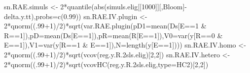 \documentclass[
]{book}
\newenvironment{Shaded}{\begin{snugshade}}{\end{snugshade}}
\newcommand{\AttributeTok}[1]{\textcolor[rgb]{0.77,0.63,0.00}{#1}}
\newcommand{\DecValTok}[1]{\textcolor[rgb]{0.00,0.00,0.81}{#1}}
\newcommand{\FloatTok}[1]{\textcolor[rgb]{0.00,0.00,0.81}{#1}}
\newcommand{\FunctionTok}[1]{\textcolor[rgb]{0.00,0.00,0.00}{#1}}
\newcommand{\NormalTok}[1]{#1}
\newcommand{\OtherTok}[1]{\textcolor[rgb]{0.56,0.35,0.01}{#1}}
\newcommand{\SpecialCharTok}[1]{\textcolor[rgb]{0.00,0.00,0.00}{#1}}
\newcommand{\StringTok}[1]{\textcolor[rgb]{0.31,0.60,0.02}{#1}}
\theoremstyle{definition}
\theoremstyle{definition}
\theoremstyle{definition}
\theoremstyle{definition}
\theoremstyle{remark}
\begin{document}
\begin{Shaded}
\begin{Highlighting}[]
\NormalTok{sn.RAE.simuls }\OtherTok{\textless{}{-}} \DecValTok{2}\SpecialCharTok{*}\FunctionTok{quantile}\NormalTok{(}\FunctionTok{abs}\NormalTok{(simuls.elig[[}\StringTok{\textquotesingle{}1000\textquotesingle{}}\NormalTok{]][,}\StringTok{\textquotesingle{}Bloom\textquotesingle{}}\NormalTok{]}\SpecialCharTok{{-}}\NormalTok{delta.y.tt),}\AttributeTok{probs=}\FunctionTok{c}\NormalTok{(}\FloatTok{0.99}\NormalTok{))}
\NormalTok{sn.RAE.IV.plugin }\OtherTok{\textless{}{-}} \DecValTok{2}\SpecialCharTok{*}\FunctionTok{qnorm}\NormalTok{((.}\DecValTok{99}\SpecialCharTok{+}\DecValTok{1}\NormalTok{)}\SpecialCharTok{/}\DecValTok{2}\NormalTok{)}\SpecialCharTok{*}\FunctionTok{sqrt}\NormalTok{(}\FunctionTok{var.RAE.plugin}\NormalTok{(}\AttributeTok{pD1=}\FunctionTok{mean}\NormalTok{(Ds[E}\SpecialCharTok{==}\DecValTok{1} \SpecialCharTok{\&}\NormalTok{ R}\SpecialCharTok{==}\DecValTok{1}\NormalTok{]),}\AttributeTok{pD=}\FunctionTok{mean}\NormalTok{(Ds[E}\SpecialCharTok{==}\DecValTok{1}\NormalTok{]),}\AttributeTok{pR=}\FunctionTok{mean}\NormalTok{(R[E}\SpecialCharTok{==}\DecValTok{1}\NormalTok{]),}\AttributeTok{V0=}\FunctionTok{var}\NormalTok{(y[R}\SpecialCharTok{==}\DecValTok{0} \SpecialCharTok{\&}\NormalTok{ E}\SpecialCharTok{==}\DecValTok{1}\NormalTok{]),}\AttributeTok{V1=}\FunctionTok{var}\NormalTok{(y[R}\SpecialCharTok{==}\DecValTok{1} \SpecialCharTok{\&}\NormalTok{ E}\SpecialCharTok{==}\DecValTok{1}\NormalTok{]),}\AttributeTok{N=}\FunctionTok{length}\NormalTok{(y[E}\SpecialCharTok{==}\DecValTok{1}\NormalTok{])))}
\NormalTok{sn.RAE.IV.homo }\OtherTok{\textless{}{-}} \DecValTok{2}\SpecialCharTok{*}\FunctionTok{qnorm}\NormalTok{((.}\DecValTok{99}\SpecialCharTok{+}\DecValTok{1}\NormalTok{)}\SpecialCharTok{/}\DecValTok{2}\NormalTok{)}\SpecialCharTok{*}\FunctionTok{sqrt}\NormalTok{(}\FunctionTok{vcov}\NormalTok{(reg.y.R}\FloatTok{.2}\NormalTok{sls.elig)[}\DecValTok{2}\NormalTok{,}\DecValTok{2}\NormalTok{])}
\NormalTok{sn.RAE.IV.hetero }\OtherTok{\textless{}{-}} \DecValTok{2}\SpecialCharTok{*}\FunctionTok{qnorm}\NormalTok{((.}\DecValTok{99}\SpecialCharTok{+}\DecValTok{1}\NormalTok{)}\SpecialCharTok{/}\DecValTok{2}\NormalTok{)}\SpecialCharTok{*}\FunctionTok{sqrt}\NormalTok{(}\FunctionTok{vcovHC}\NormalTok{(reg.y.R}\FloatTok{.2}\NormalTok{sls.elig,}\AttributeTok{type=}\StringTok{\textquotesingle{}HC2\textquotesingle{}}\NormalTok{)[}\DecValTok{2}\NormalTok{,}\DecValTok{2}\NormalTok{])}
\end{Highlighting}
\end{Shaded}
\end{document}
